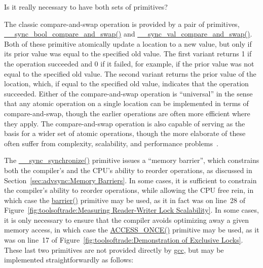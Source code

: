 \QuickQuiz{}
	Is it really necessary to have both sets of primitives?
 \QuickQuizEnd

The classic compare-and-swap operation is provided by a pair of
primitives, \url{__sync_bool_compare_and_swap()} and
\url{__sync_val_compare_and_swap()}.
Both of these primitive atomically update a location to a new value,
but only if its prior value was equal to the specified old value.
The first variant returns 1 if the operation succeeded and 0 if it
failed, for example, if the prior value was not equal to the specified
old value.
The second variant returns the prior value of the location, which, if
equal to the specified old value, indicates that the operation succeeded.
Either of the compare-and-swap operation is ``universal'' in the sense
that any atomic operation on a single location can be implemented in
terms of compare-and-swap, though the earlier operations are often
more efficient where they apply.
The compare-and-swap operation is also capable of serving as the basis
for a wider set of atomic operations, though the more elaborate of
these often suffer from complexity, scalability, and performance
problems~\cite{MauriceHerlihy90a}.

The \url{__sync_synchronize()} primitive issues a ``memory barrier'',
which constrains both the compiler's and the CPU's ability to reorder
operations, as discussed in Section~\ref{sec:advsync:Memory Barriers}.
In some cases, it is sufficient to constrain the compiler's ability
to reorder operations, while allowing the CPU free rein, in which
case the \url{barrier()} primitive may be used, as it in fact was
on line~28 of
Figure~\ref{fig:toolsoftrade:Measuring Reader-Writer Lock Scalability}.
In some cases, it is only necessary to ensure that the compiler
avoids optimizing away a given memory access, in which case the
\url{ACCESS_ONCE()} primitive may be used, as it was on line~17 of
Figure~\ref{fig:toolsoftrade:Demonstration of Exclusive Locks}.
These last two primitives are not provided directly by \url{gcc},
but may be implemented straightforwardly as follows:


